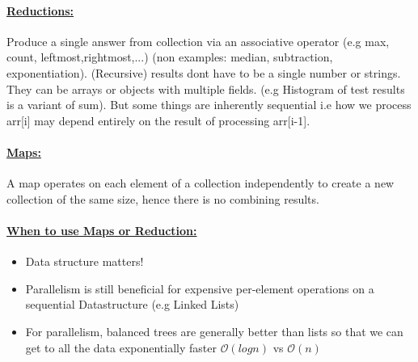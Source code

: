 \documentclass[8pt]{extreport}
\begin{document}
\paragraph{\underline{Reductions:}} Produce a single answer from collection via an associative operator (e.g max, count, leftmost,rightmost,...) (non examples: median, subtraction, exponentiation). (Recursive) results dont have to be a single number or strings. They can be arrays or objects with multiple fields. (e.g Histogram of test results is a variant of sum).
But some things are inherently sequential i.e how we process arr[i] may depend entirely on the result of processing arr[i-1].
\paragraph{\underline{Maps:}} A map operates on each element of a collection independently to create a new collection of the same size, hence there is no combining results.
\paragraph{\underline{When to use Maps or Reduction:}}
\begin{itemize}
\item Data structure matters!
\item Parallelism is still beneficial for expensive per-element operations on a sequential Datastructure (e.g Linked Lists)
\item For parallelism, balanced trees are generally better than lists so that we can get to all the data exponentially faster $\mathcal{O}(logn)$ vs $\mathcal{O}(n)$
\end{itemize}
\end{document}
